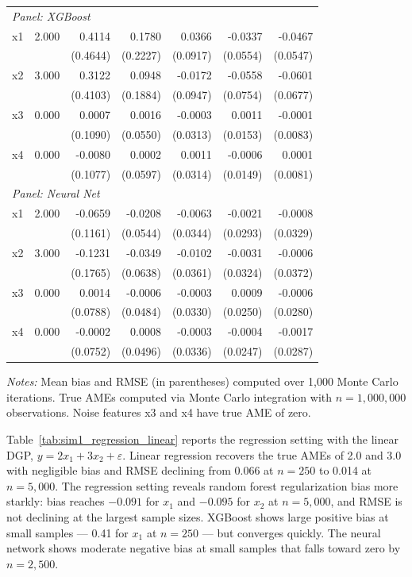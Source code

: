 \documentclass[conference]{IEEEtran}
\begin{document}
\begin{table}[htbp]
\begin{threeparttable}
\begin{tabular}{lrrrrrr}
				\multicolumn{7}{l}{\textit{Panel: XGBoost}} \\
				\quad x1 & 2.000 & 0.4114 & 0.1780 & 0.0366 & -0.0337 & -0.0467 \\
				&  & (0.4644) & (0.2227) & (0.0917) & (0.0554) & (0.0547) \\
				\quad x2 & 3.000 & 0.3122 & 0.0948 & -0.0172 & -0.0558 & -0.0601 \\
				&  & (0.4103) & (0.1884) & (0.0947) & (0.0754) & (0.0677) \\
				\quad x3 & 0.000 & 0.0007 & 0.0016 & -0.0003 & 0.0011 & -0.0001 \\
				&  & (0.1090) & (0.0550) & (0.0313) & (0.0153) & (0.0083) \\
				\quad x4 & 0.000 & -0.0080 & 0.0002 & 0.0011 & -0.0006 & 0.0001 \\
				&  & (0.1077) & (0.0597) & (0.0314) & (0.0149) & (0.0081) \\
				\midrule
				\multicolumn{7}{l}{\textit{Panel: Neural Net}} \\
				\quad x1 & 2.000 & -0.0659 & -0.0208 & -0.0063 & -0.0021 & -0.0008 \\
				&  & (0.1161) & (0.0544) & (0.0344) & (0.0293) & (0.0329) \\
				\quad x2 & 3.000 & -0.1231 & -0.0349 & -0.0102 & -0.0031 & -0.0006 \\
				&  & (0.1765) & (0.0638) & (0.0361) & (0.0324) & (0.0372) \\
				\quad x3 & 0.000 & 0.0014 & -0.0006 & -0.0003 & 0.0009 & -0.0006 \\
				&  & (0.0788) & (0.0484) & (0.0330) & (0.0250) & (0.0280) \\
				\quad x4 & 0.000 & -0.0002 & 0.0008 & -0.0003 & -0.0004 & -0.0017 \\
				&  & (0.0752) & (0.0496) & (0.0336) & (0.0247) & (0.0287) \\
				\bottomrule
			\end{tabular}
			\begin{tablenotes}
				\footnotesize
				\item \textit{Notes:} Mean bias and RMSE (in parentheses) computed over 1,000 Monte Carlo iterations. True AMEs computed via Monte Carlo integration with $n=1{,}000{,}000$ observations. Noise features x3 and x4 have true AME of zero.
			\end{tablenotes}
		\end{threeparttable}
	\end{table}
	
	Table~\ref{tab:sim1_regression_linear} reports the regression setting with the linear DGP, $y = 2x_1 + 3x_2 + \varepsilon$. Linear regression recovers the true AMEs of 2.0 and 3.0 with negligible bias and RMSE declining from 0.066 at $n=250$ to 0.014 at $n=5{,}000$. The regression setting reveals random forest regularization bias more starkly: bias reaches $-0.091$ for $x_1$ and $-0.095$ for $x_2$ at $n=5{,}000$, and RMSE is not declining at the largest sample sizes. XGBoost shows large positive bias at small samples --- 0.41 for $x_1$ at $n=250$ --- but converges quickly. The neural network shows moderate negative bias at small samples that falls toward zero by $n=2{,}500$.
	
\end{document}
